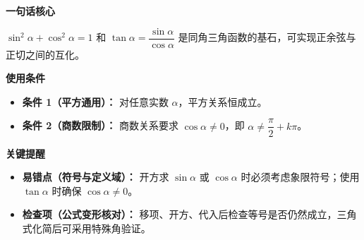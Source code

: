 \begin{summarybox}
	\textbf{\textcolor{CSummary}{一句话核心}}

	$\sin^2\alpha+\cos^2\alpha=1$ 和 $\tan\alpha=\dfrac{\sin\alpha}{\cos\alpha}$ 是同角三角函数的基石，可实现正余弦与正切之间的互化。

	\medskip
	\textbf{\textcolor{CSummary}{使用条件}}
	\begin{itemize}[leftmargin=*, itemsep=0.5em, topsep=0.4em]
		\item \textbf{条件 1（平方通用）：} 对任意实数 $\alpha$，平方关系恒成立。
		\item \textbf{条件 2（商数限制）：} 商数关系要求 $\cos\alpha\neq0$，即 $\alpha\neq\dfrac{\pi}{2}+k\pi$。
	\end{itemize}

	\medskip
	\textbf{\textcolor{CSummary}{关键提醒}}
	\begin{itemize}[leftmargin=*, itemsep=0.5em, topsep=0.4em]
		\item \textbf{易错点（符号与定义域）：} 开方求 $\sin\alpha$ 或 $\cos\alpha$ 时必须考虑象限符号；使用 $\tan\alpha$ 时确保 $\cos\alpha\neq0$。
		\item \textbf{检查项（公式变形核对）：} 移项、开方、代入后检查等号是否仍然成立，三角式化简后可采用特殊角验证。
	\end{itemize}
\end{summarybox}
